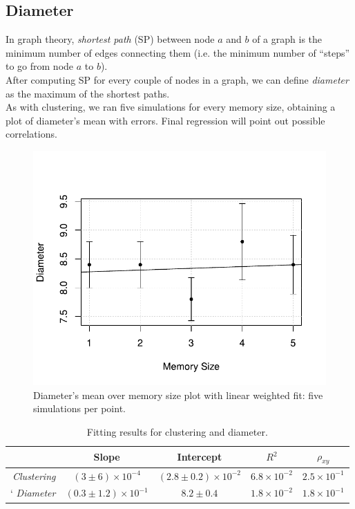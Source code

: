 \subsection{Diameter} \label{diameter}
In graph theory, \textit{shortest path}\cite{diameter} (SP)
between node $a$ and $b$ of a graph is the minimum number of
edges connecting them (i.e. the minimum number of ``steps'' to go
from node $a$ to $b$).\\
After computing SP for every couple of nodes in a graph, we can
define \textit{diameter}\cite{diameter} as the maximum of the
shortest paths.\\
As with clustering, we ran five simulations for every memory
size, obtaining a plot of diameter's mean with errors.
Final regression will point out possible correlations.
\begin{figure}[h]
  \centering
  \includegraphics[trim={0cm 0cm 0cm 1cm},clip,width=.8\columnwidth]{img/diameter.pdf}
  \caption[Diameter's mean over memory size]
  {Diameter's mean over memory size plot with linear weighted fit:
    five simulations per point.}
  \label{fig:diameter}
\end{figure}
\begin{table}[h]
\label{tab:clusteringdiameter}
\centering
\begin{tabular}{r|cccc}
\toprule
& Slope & Intercept & $R^2$ & $\rho_{xy}$ \\
\midrule
\textit{Clustering} & $(3 \pm 6) \times 10^{-4}$ &$(2.8 \pm 0.2) \times 10^{-2}$ &$6.8 \times 10^{-2}$ & $2.5 \times 10^{-1}$ \\`
\textit{Diameter} & $(0.3 \pm 1.2) \times 10^{-1}$ & $8.2 \pm 0.4$ & $1.8 \times 10^{-2}$ & $1.8 \times 10^{-1}$  \\
\bottomrule
\end{tabular}
\caption{Fitting results for clustering and diameter.}
\end{table}
